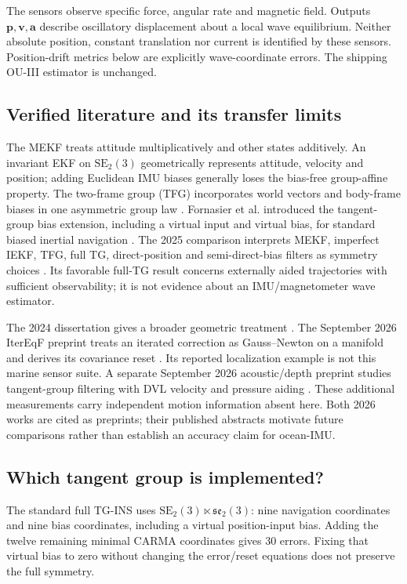 \documentclass[conference]{IEEEtran}
\newcommand{\vc}[1]{\bm{#1}}
\begin{document}
The sensors observe specific force, angular rate and magnetic field. Outputs
$\vc p,\vc v,\vc a$ describe oscillatory displacement about a local wave
equilibrium. Neither absolute position, constant translation nor current is
identified by these sensors. Position-drift metrics below are explicitly
wave-coordinate errors. The shipping OU-III estimator is unchanged.

\subsection{Verified literature and its transfer limits}
The MEKF treats attitude multiplicatively and other states additively.
An invariant EKF on $\mathrm{SE}_2(3)$ geometrically represents attitude,
velocity and position; adding Euclidean IMU biases generally loses the
bias-free group-affine property. The two-frame group (TFG) incorporates
world vectors and body-frame biases in one asymmetric group law
\cite{barrau2023}. Fornasier et al. introduced the tangent-group bias
extension, including a virtual input and virtual bias, for standard biased
inertial navigation \cite{fornasier2022}. The 2025 comparison interprets
MEKF, imperfect IEKF, TFG, full TG, direct-position and semi-direct-bias
filters as symmetry choices \cite{fornasier2025}. Its favorable full-TG
result concerns externally aided trajectories with sufficient observability;
it is not evidence about an IMU/magnetometer wave estimator.

The 2024 dissertation gives a broader geometric treatment
\cite{fornasier2024}. The September 2026 IterEqF preprint treats an iterated
correction as Gauss--Newton on a manifold and derives its covariance reset
\cite{vantoor2026}. Its reported localization example is not this marine
sensor suite. A separate September 2026 acoustic/depth preprint studies
tangent-group filtering with DVL velocity and pressure aiding
\cite{lunawat2026}. These additional measurements carry independent motion
information absent here. Both 2026 works are cited as preprints; their
published abstracts motivate future comparisons rather than establish an
accuracy claim for ocean-IMU.

\subsection{Which tangent group is implemented?}
The standard full TG-INS uses
$\mathrm{SE}_2(3)\ltimes\mathfrak{se}_2(3)$: nine navigation coordinates
and nine bias coordinates, including a virtual position-input bias. Adding
the twelve remaining minimal CARMA coordinates gives 30 errors. Fixing that
virtual bias to zero without changing the error/reset equations does not
preserve the full symmetry.
\end{document}
